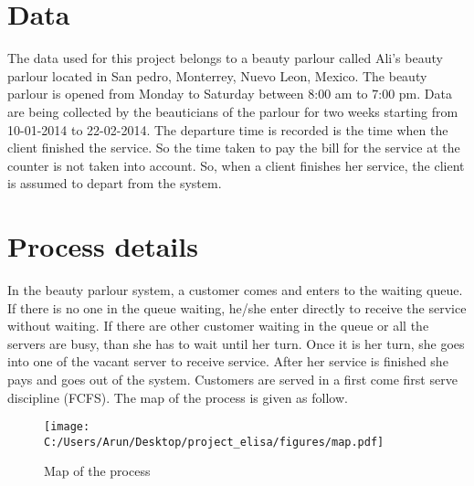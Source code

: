 \documentclass{article}
\theoremstyle{definition}
\begin{document}
\section{Data}
The data used for this project belongs to a beauty parlour called Ali's beauty parlour located in San pedro, Monterrey, Nuevo Leon, Mexico. The beauty parlour is opened from Monday to Saturday between 8:00 am to 7:00 pm. Data are being collected by the beauticians of the parlour for two weeks starting from 10-01-2014 to 22-02-2014. The departure time is recorded is the time when the client finished the service. So the time taken to pay the bill for the service at the counter is not taken into account. So, when a client finishes her service, the client is assumed to depart from the system.

\section{Process details}

In the beauty parlour system, a customer comes and enters to the waiting queue. If there is no one in the queue waiting, he/she enter directly to receive the service without waiting. If there are other customer waiting in the queue or all the servers are busy, than she has to wait until her turn. Once it is her turn, she goes into one of the vacant server to receive service. After her service is finished she pays and goes out of the system. Customers are served in a first come first serve discipline (FCFS). The map of the process is given as follow.

\begin{figure}[H]
\texttt{[image: C:/Users/Arun/Desktop/project\_elisa/figures/map.pdf]}{\centering}
\caption{Map of the process}
\label{fig:map}
\end{figure}
\end{document}
